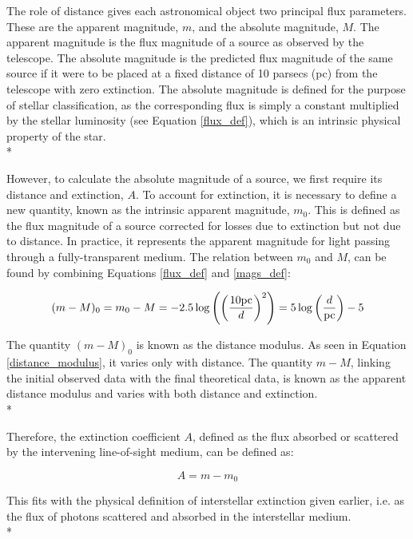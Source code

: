 \documentclass[12pt, a4paper]{report}
\begin{document}
The role of distance gives each astronomical object two principal flux parameters. These are the apparent magnitude, $m$, and the absolute magnitude, $M$. The apparent magnitude is the flux magnitude of a source as observed by the telescope. The absolute magnitude is the predicted flux magnitude of the same source if it were to be placed at a fixed distance of 10 parsecs (pc) from the telescope with zero extinction. The absolute magnitude is defined for the purpose of stellar classification, as the corresponding flux is simply a constant multiplied by the stellar luminosity (see Equation \ref{flux_def}), which is an intrinsic physical property of the star. \\*

However, to calculate the absolute magnitude of a source, we first require its distance and extinction, $A$. To account for extinction, it is necessary to define a new quantity, known as the intrinsic apparent magnitude, $m_{0}$. This is defined as the flux magnitude of a source corrected for losses due to extinction but not due to distance. In practice, it represents the apparent magnitude for light passing through a fully-transparent medium. The relation between $m_{0}$ and $M$, can be found by combining Equations \ref{flux_def} and \ref{mags_def}:

\begin{equation}
\label{distance_modulus}
(m - M)_{0} = m_{0} - M = -2.5\log \left( \left(\frac{10\textnormal{pc}}{d}\right)^{2} \right) = 5\log\left(\frac{d}{\textnormal{pc}}\right) - 5
\end{equation}

The quantity $(m - M)_{0}$ is known as the distance modulus. As seen in Equation \ref{distance_modulus}, it varies only with distance. The quantity $m - M$, linking the initial observed data with the final theoretical data, is known as the apparent distance modulus and varies with both distance and extinction. \\*

Therefore, the extinction coefficient $A$, defined as the flux absorbed or scattered by the intervening line-of-sight medium, can be defined as:

\begin{equation}
\label{bol_extinc}
A = m - m_{0}
\end{equation}

This fits with the physical definition of interstellar extinction given earlier, i.e. as the flux of photons scattered and absorbed in the interstellar medium. \\*
\end{document}
